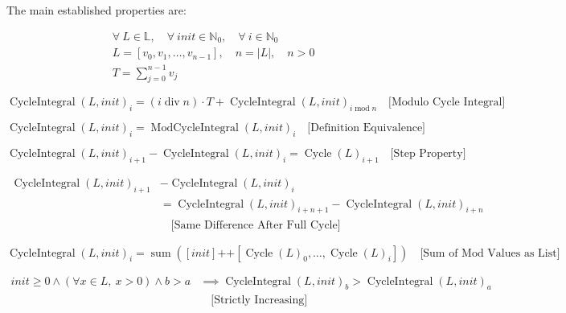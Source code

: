 The main established properties are:

\begin{equation*}
\begin{aligned}
&\forall \ L \in \mathbb{L},\quad \forall \ init \in \mathbb{N}_0,\quad \forall \ i \in \mathbb{N}_0 \\
&L = [v_0, v_1, \dots, v_{n-1}], \quad n = |L|,\quad n > 0 \\
&T = \sum_{j=0}^{n-1} v_j
\end{aligned}
\end{equation*}

\begin{equation*}
\operatorname{CycleIntegral}(L, init)_i
= \left(i \operatorname{div} n\right) \cdot T
 + \operatorname{CycleIntegral}(L, init)_{i \operatorname{mod} n}
\quad \text{[Modulo Cycle Integral]}
\end{equation*}

\begin{equation*}
\operatorname{CycleIntegral}(L, init)_i
= \operatorname{ModCycleIntegral}(L, init)_i
\quad \text{[Definition Equivalence]}
\end{equation*}

\begin{equation*}
\operatorname{CycleIntegral}(L, init)_{i+1}
- \operatorname{CycleIntegral}(L, init)_i
= \operatorname{Cycle}(L)_{i+1}
\quad \text{[Step Property]}
\end{equation*}

\begin{equation*}
\begin{aligned}
\operatorname{CycleIntegral}(L, init)_{i+1}
&- \operatorname{CycleIntegral}(L, init)_i \\
&= \operatorname{CycleIntegral}(L, init)_{i+n+1}
 - \operatorname{CycleIntegral}(L, init)_{i+n} \\
&\quad \text{[Same Difference After Full Cycle]}
\end{aligned}
\end{equation*}

\begin{equation*}
\operatorname{CycleIntegral}(L, init)_i
= \operatorname{sum}([init] \mathbin{\texttt{++}}
 [\operatorname{Cycle}(L)_0, \ldots, \operatorname{Cycle}(L)_i])
\quad \text{[Sum of Mod Values as List]}
\end{equation*}

\begin{equation*}
\begin{aligned}
init \geq 0 \land (\forall x \in L,\ x > 0) \land b > a
&\implies
\operatorname{CycleIntegral}(L, init)_b > \operatorname{CycleIntegral}(L, init)_a \\
&\quad \text{[Strictly Increasing]}
\end{aligned}
\end{equation*}

